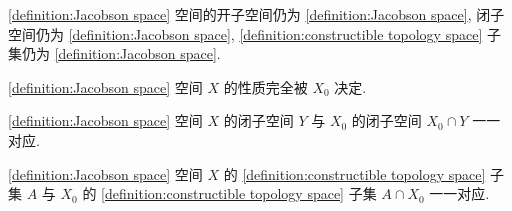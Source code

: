 \begin{lemma}
    \ref{definition:Jacobson space} 空间的开子空间仍为 \ref{definition:Jacobson space},
    闭子空间仍为 \ref{definition:Jacobson space}, \ref{definition:constructible topology space} 子集仍为 \ref{definition:Jacobson space}.
\end{lemma}

\ref{definition:Jacobson space} 空间 \(X\) 的性质完全被 \(X_0\) 决定.

\begin{lemma}
    \ref{definition:Jacobson space} 空间 \(X\) 的闭子空间 \(Y\) 与 \(X_0\) 的闭子空间 \(X_0 \cap Y\) 一一对应.
\end{lemma}

\begin{lemma}
    \ref{definition:Jacobson space} 空间 \(X\) 的 \ref{definition:constructible topology space} 子集 \(A\) 与 \(X_0\) 的 \ref{definition:constructible topology space} 子集 \(A \cap X_0\) 一一对应.
\end{lemma}
